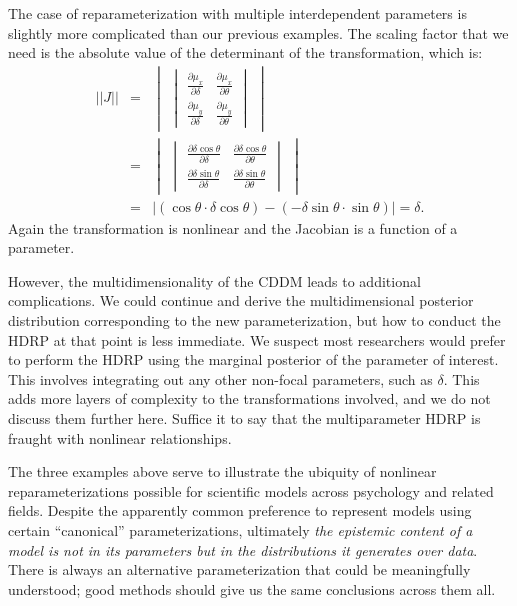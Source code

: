 \documentclass[man]{apa}
\newcommand{\hdr}{HDRP}
\def\driftangle{\theta}
\def\driftlength{\delta}
\def\mux{\mu_x}
\def\muy{\mu_y}
\begin{document}
The case of reparameterization with multiple interdependent parameters is slightly more complicated than our previous examples. The scaling factor that we need is the absolute value of the determinant of the transformation, which is:
\begin{eqnarray*}
||J|| &=& \begin{vmatrix} \begin{vmatrix}
   \frac{\partial \mux}{\partial \driftlength}&\frac{\partial \mux}{\partial \driftangle}\\
   \frac{\partial \muy}{\partial \driftlength}&\frac{\partial \muy}{\partial \driftangle}
    \end{vmatrix} \end{vmatrix}\\ &=& \begin{vmatrix} \begin{vmatrix}
   \frac{\partial \driftlength \cos \driftangle}{\partial \driftlength}&\frac{\partial \driftlength \cos \driftangle}{\partial \driftangle}\\
   \frac{\partial \driftlength \sin \driftangle}{\partial \driftlength}&\frac{\partial \driftlength \sin \driftangle}{\partial \driftangle}
    \end{vmatrix} \end{vmatrix}\\ &=&
    \left|\left(\cos \driftangle \cdot \driftlength \cos \driftangle \right)-\left(- \driftlength \sin \driftangle \cdot \sin \driftangle \right)\right|=\driftlength.
\end{eqnarray*}
Again the transformation is nonlinear and the Jacobian is a function of a parameter.

However, the multidimensionality of the CDDM leads to additional complications.  We could continue and derive the multidimensional posterior distribution corresponding to the new parameterization, but how to conduct the \hdr{} at that point is less immediate.  We suspect most researchers would prefer to perform the \hdr{} using the marginal posterior of the parameter of interest. This involves integrating out any other non-focal parameters, such as $\driftlength$. This adds more layers of complexity to the transformations involved, and we do not discuss them further here. Suffice it to say that the multiparameter \hdr{} is fraught with nonlinear relationships. 

The three examples above serve to illustrate the ubiquity of nonlinear reparameterizations possible for scientific models across psychology and related fields. Despite the apparently common preference to represent models using certain ``canonical'' parameterizations, ultimately \textit{the epistemic content of a model is not in its parameters but in the distributions it generates over data}. There is always an alternative parameterization that could be meaningfully understood; good methods should give us the same conclusions across them all.
\end{document}
